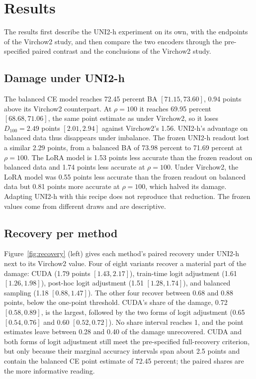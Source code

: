 \section{Results}
\label{sec:results}
The results first describe the UNI2-h experiment on its own, with the endpoints of the Virchow2 study, and then compare the two encoders through the pre-specified paired contrast and the conclusions of the Virchow2 study.

\subsection{Damage under UNI2-h}
The balanced CE model reaches 72.45 percent BA $[71.15, 73.60]$, 0.94 points above its Virchow2 counterpart. At $\rho=100$ it reaches 69.95 percent $[68.68, 71.06]$, the same point estimate as under Virchow2, so it loses $D_{100}=2.49$ points $[2.01, 2.94]$ against Virchow2's 1.56. UNI2-h's advantage on balanced data thus disappears under imbalance. The frozen UNI2-h readout lost a similar 2.29 points, from a balanced BA of 73.98 percent to 71.69 percent at $\rho=100$. The LoRA model is 1.53 points less accurate than the frozen readout on balanced data and 1.74 points less accurate at $\rho=100$. Under Virchow2, the LoRA model was 0.55 points less accurate than the frozen readout on balanced data but 0.81 points more accurate at $\rho=100$, which halved its damage. Adapting UNI2-h with this recipe does not reproduce that reduction. The frozen values come from different draws and are descriptive.

\subsection{Recovery per method}
Figure~\ref{fig:recovery} (left) gives each method's paired recovery under UNI2-h next to its Virchow2 value. Four of eight variants recover a material part of the damage: CUDA (1.79 points $[1.43, 2.17]$), train-time logit adjustment (1.61 $[1.26, 1.98]$), post-hoc logit adjustment (1.51 $[1.28, 1.74]$), and balanced sampling (1.18 $[0.88, 1.47]$). The other four recover between 0.68 and 0.88 points, below the one-point threshold. CUDA's share of the damage, 0.72 $[0.58, 0.89]$, is the largest, followed by the two forms of logit adjustment (0.65 $[0.54, 0.76]$ and 0.60 $[0.52, 0.72]$). No share interval reaches 1, and the point estimates leave between 0.28 and 0.40 of the damage unrecovered. CUDA and both forms of logit adjustment still meet the pre-specified full-recovery criterion, but only because their marginal accuracy intervals span about 2.5 points and contain the balanced CE point estimate of 72.45 percent; the paired shares are the more informative reading.

